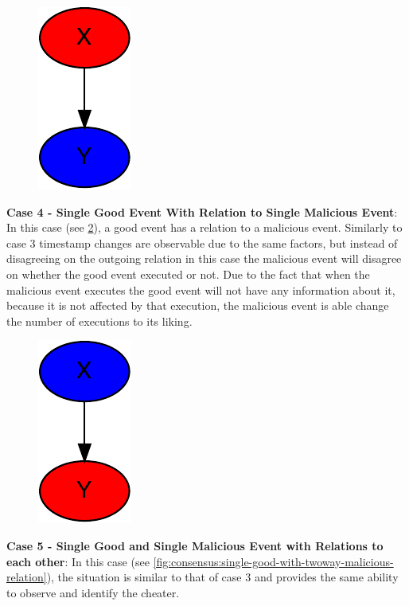 	\begin{figure}[H]
		\centering
		\includegraphics[]{5validation/images/3.pdf}
		\caption{}
		\label{fig:consensus:single-malicious-with-good-relation}
	\end{figure}
	
	\newpar \textbf{Case 4 - Single Good Event With Relation to Single Malicious Event}: In this case (see \ref{fig:consensus:single-good-with-malicious-relation}), a good event has a relation to a malicious event. Similarly to case 3 timestamp changes are observable due to the same factors, but instead of disagreeing on the outgoing relation in this case the malicious event will disagree on whether the good event executed or not. Due to the fact that when the malicious event executes the good event will not have any information about it, because it is not affected by that execution, the malicious event is able change the number of executions to its liking.
	 
	\begin{figure}[H]
		\centering
		\includegraphics[]{5validation/images/2.pdf}
		\caption{}
		\label{fig:consensus:single-good-with-malicious-relation}
	\end{figure}
	
	\newpar \textbf{Case 5 - Single Good and Single Malicious Event with Relations to each other}: In this case (see \ref{fig:consensus:single-good-with-twoway-malicious-relation}), the situation is similar to that of case 3 and provides the same ability to observe and identify the cheater.
	
